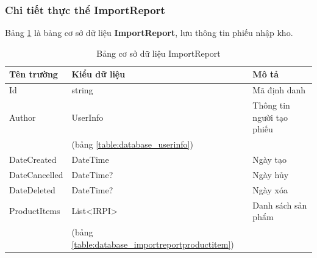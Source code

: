 \documentclass[../DoAn.tex]{subfiles}
\begin{document}
\subsubsection{Chi tiết thực thể ImportReport}
\label{subsubsection:detaildesign-database-importreport}
Bảng \ref{table:database_importreport} là bảng cơ sở dữ liệu \textbf{ImportReport}, lưu thông tin phiếu nhập kho.
\begin{table}[H]
    \centering
    \begin{tabularx}{\textwidth}{|p{4cm}|p{3cm}|X|}
        \hline
        \textbf{Tên trường} & \textbf{Kiểu dữ liệu}                               & \textbf{Mô tả}            \\ \hline
        Id                  & string                                              & Mã định danh              \\ \hline
        Author              & UserInfo                                            & Thông tin người tạo phiếu \\
                            & (bảng \ref{table:database_userinfo})                &                           \\ \hline
        DateCreated         & DateTime                                            & Ngày tạo                  \\ \hline
        DateCancelled       & DateTime?                                           & Ngày hủy                  \\ \hline
        DateDeleted         & DateTime?                                           & Ngày xóa                  \\ \hline
        ProductItems        & List<IRPI>                                          & Danh sách sản phẩm        \\
                            & (bảng \ref{table:database_importreportproductitem}) &                           \\ \hline
    \end{tabularx}
    \caption{Bảng cơ sở dữ liệu ImportReport}
    \label{table:database_importreport}
\end{table}
\break
\end{document}
